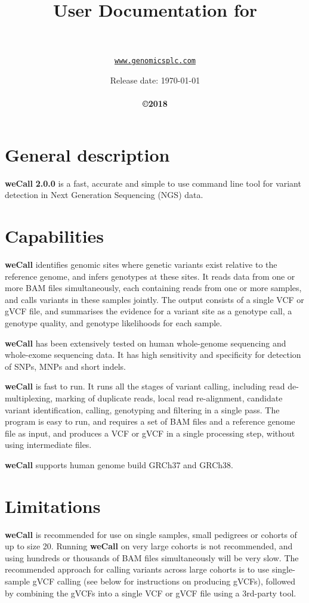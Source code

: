 \documentclass{article}
\title{User Documentation for {\wecallbranding}}
\author{
    {\companyname}\\\\
    \texttt{\url{www.genomicsplc.com}}
}
\date{Release date: \today\\\vspace{5mm}\textit\\\vspace{5mm}
  \small{\textbf{
      \vspace{5mm}\copyright 2018 {\companyname}}}}
\newcommand{\wecallproduct}{\textbf{weCall}}
\newcommand{\wecallversion}{\textbf{2.0.0}}
\newcommand{\wecallbranding}{{\wecallproduct} {\wecallversion}}
\begin{document}
\maketitle
\hypersetup{linkcolor=black}
\tableofcontents
\newpage


\section{General description}
{\wecallbranding} is a fast, accurate and simple to use command line tool for variant detection in Next Generation Sequencing (NGS) data.
        
\section{Capabilities}
\textbf{{\wecallproduct}} identifies genomic sites where genetic variants exist relative to the reference genome,
and infers genotypes at these sites.  It reads data from one or more BAM files simultaneously, each containing reads from one or more samples,
and calls variants in these samples jointly.  The output consists of a single VCF or gVCF file, and summarises the evidence for a variant site
as a genotype call, a genotype quality, and genotype likelihoods for each sample.

\textbf{{\wecallproduct}} has been extensively tested on human whole-genome sequencing and whole-exome sequencing data. It has high sensitivity and specificity
for detection of SNPs, MNPs and short indels.

{\wecallproduct} is fast to run.  It runs all the stages of variant calling, including read de-multiplexing,
marking of duplicate reads, local read re-alignment, candidate variant identification, calling, genotyping and filtering in a single pass.  The program is easy to run,
and requires a set of BAM files and a reference genome file as input, and produces a VCF or gVCF in a single processing step, without using intermediate files.

 \textbf{{\wecallproduct}} supports human genome build GRCh37 and GRCh38.

 \section{Limitations}
 
\textbf{{\wecallproduct}} is recommended for use on single samples, small pedigrees or cohorts of up to size 20.  Running {\wecallproduct}
on very large cohorts is not recommended, and using hundreds or thousands of BAM files simultaneously will be very slow.
The recommended approach for calling variants across large cohorts is to use single-sample gVCF calling (see below for instructions on producing gVCFs),
followed by combining the gVCFs into a single VCF or gVCF file using a 3rd-party tool.
\end{document}

